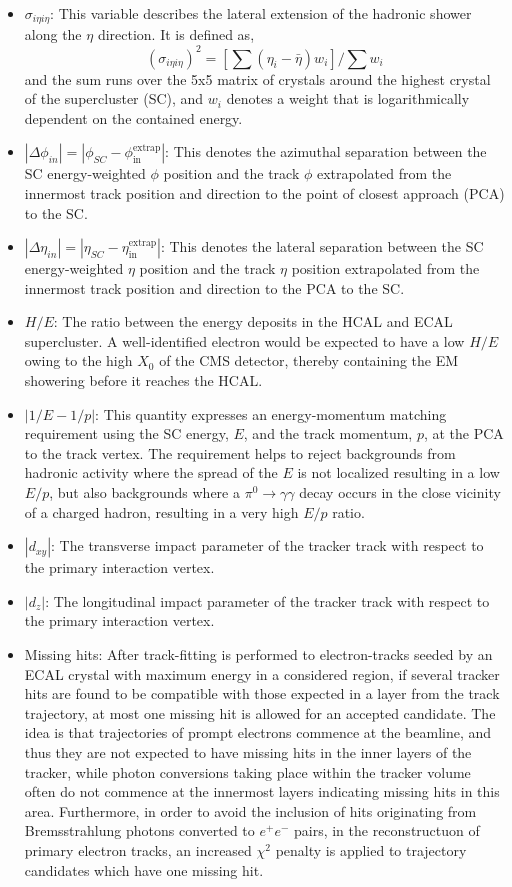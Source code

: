 \begin{itemize}
\item $\sigma_{i\eta i\eta}$: This variable describes the lateral extension of the hadronic shower along the $\eta$ direction. It is defined as,
  \begin{equation}
    (\sigma_{i\eta i\eta})^2 = [\sum{(\eta_i - \bar{\eta})w_i}]/\sum{w_i}
    \label{eq:sigietaieta}
  \end{equation}
  and the sum runs over the 5x5 matrix of crystals around the highest \Et crystal of the supercluster (SC), and $w_i$ denotes a weight that is logarithmically dependent on the contained energy.
\item $|\Delta\phi_{in}| = |\phi_{SC} - \phi^{\mathrm{extrap}}_{\mathrm{in}}|$: This denotes the azimuthal separation between the SC energy-weighted $\phi$ position and the track $\phi$ extrapolated from the innermost track position and direction to the point of closest approach (PCA) to the SC.
\item $|\Delta\eta_{in}| = |\eta_{SC} - \eta^{\mathrm{extrap}}_{\mathrm{in}}|$: This denotes the lateral separation between the SC energy-weighted $\eta$ position and the track $\eta$ position extrapolated from the innermost track position and direction to the PCA to the SC.
\item $H/E$: The ratio between the energy deposits in the HCAL and ECAL supercluster. A well-identified electron would be expected to have a low $H/E$ owing to the high $X_0$ of the CMS detector, thereby containing the EM showering before it reaches the HCAL.
\item $|1/E - 1/p|$: This quantity expresses an energy-momentum matching requirement using the SC energy, $E$, and the track momentum, $p$, at the PCA to the track vertex. The requirement helps to reject backgrounds from hadronic activity where the spread of the $E$ is not localized resulting in a low $E/p$, but also backgrounds where a $\pi^0\rightarrow \gamma \gamma$ decay occurs in the close vicinity of a charged hadron, resulting in a very high $E/p$ ratio.  
\item $|{d_{xy}}|$: The transverse impact parameter of the tracker track with respect to the primary interaction vertex.
\item $|{d_{z}}|$: The longitudinal impact parameter of the tracker track with respect to the primary interaction vertex.
\item Missing hits: After track-fitting is performed to electron-tracks seeded by an ECAL crystal with maximum energy in a considered region, if several tracker hits are found to be compatible with those expected in a layer from the track trajectory, at most one missing hit is allowed for an accepted candidate. The idea is that trajectories of prompt electrons commence at the beamline, and thus they are not expected to have missing hits in the inner layers of the tracker, while photon conversions taking place within the tracker volume often do not commence at the innermost layers indicating missing hits in this area. Furthermore, in order to avoid the inclusion of hits originating from Bremsstrahlung photons converted to $e^{+}e^{-}$ pairs, in the reconstructuon of primary electron tracks, an increased $\chi^2$ penalty is applied to trajectory candidates which have one missing hit.

\end{itemize}
